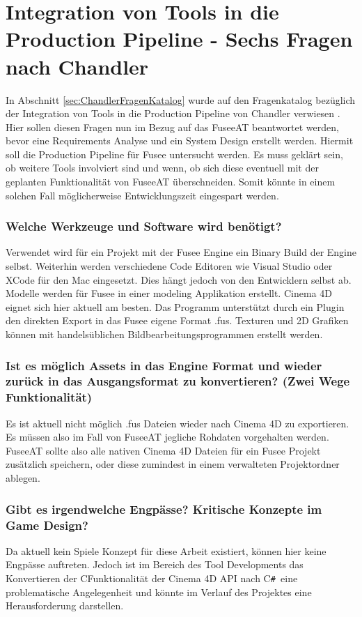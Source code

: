 \documentclass[pagesize, paper=a4, fontsize=12pt, titlepage=true, headings=small, headnosepline, abstractoff, liststotoc, nochapterprefix, plainheadsepline, twoside]{scrreprt}
\newcommand{\CSS}{C\texttt{\# }}
\newcommand{\CPP}{C\nolinebreak\hspace{-.05em}\raisebox{.4ex}{\tiny\bf +}\nolinebreak\hspace{-.10em}\raisebox{.4ex}{\tiny\bf +}}
\begin{document}
\section{Integration von Tools in die Production Pipeline - Sechs Fragen nach Chandler }\label{sec:ChandlerFragenAntwort}
In Abschnitt \ref{sec:ChandlerFragenKatalog} wurde auf den Fragenkatalog bezüglich der Integration von Tools in die Production Pipeline von Chandler verwiesen \parencite[S. 223-224]{Chandler2006}. Hier sollen diesen Fragen nun im Bezug auf das FuseeAT beantwortet werden, bevor eine Requirements Analyse und ein System Design erstellt werden. Hiermit soll die Production Pipeline für Fusee untersucht werden. Es muss geklärt sein, ob weitere Tools involviert sind und wenn, ob sich diese eventuell mit der geplanten Funktionalität von FuseeAT überschneiden. Somit könnte in einem solchen Fall möglicherweise Entwicklungszeit eingespart werden.

\subsubsection{Welche Werkzeuge und Software wird benötigt?}
Verwendet wird für ein Projekt mit der Fusee Engine ein Binary Build der Engine selbst. Weiterhin werden verschiedene Code Editoren wie Visual Studio oder XCode für den Mac eingesetzt. Dies hängt jedoch von den Entwicklern selbst ab. Modelle werden für Fusee in einer modeling Applikation erstellt. Cinema 4D eignet sich hier aktuell am besten. Das Programm unterstützt durch ein Plugin den direkten Export in das Fusee eigene Format .fus. Texturen und 2D Grafiken können mit handelsüblichen Bildbearbeitungsprogrammen erstellt werden.

\subsubsection{Ist es möglich Assets in das Engine Format und wieder zurück in das Ausgangsformat zu konvertieren? (Zwei Wege Funktionalität)}
Es ist aktuell nicht möglich .fus Dateien wieder nach Cinema 4D zu exportieren. Es müssen also im Fall von FuseeAT jegliche Rohdaten vorgehalten werden. FuseeAT sollte also alle nativen Cinema 4D Dateien für ein Fusee Projekt zusätzlich speichern, oder diese zumindest in einem verwalteten Projektordner ablegen.

\subsubsection{Gibt es irgendwelche Engpässe? Kritische Konzepte im Game Design?}
Da aktuell kein Spiele Konzept für diese Arbeit existiert, können hier keine Engpässe auftreten. Jedoch ist im Bereich des Tool Developments das Konvertieren der \CPP Funktionalität der Cinema 4D API nach \CSS eine problematische Angelegenheit und könnte im Verlauf des Projektes eine Herausforderung darstellen.
\end{document}
